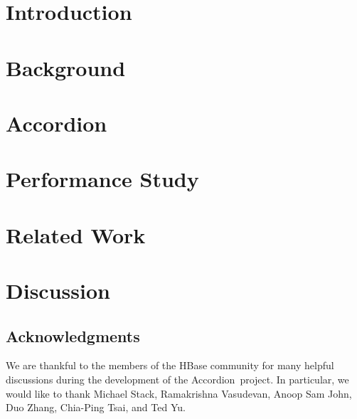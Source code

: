 \documentclass{vldb}
\newcommand{\sys}{Accordion}
\begin{document}
\section{Introduction} \label{sec:intro}
 

\section{Background} \label{sec:background}
 

\section{\sys} \label{sec:accordion}
 

\section{Performance Study} \label{sec:eval}



\section{Related Work} \label{sec:related}


\section{Discussion} \label{sec:conclusions}


\subsection*{Acknowledgments}

We are thankful to the members of the HBase community for many helpful discussions during the development of the \sys\ project. In particular, we would like to thank Michael Stack, Ramakrishna Vasudevan, Anoop Sam John, Duo Zhang, Chia-Ping Tsai, and Ted Yu.


%


\end{document}
